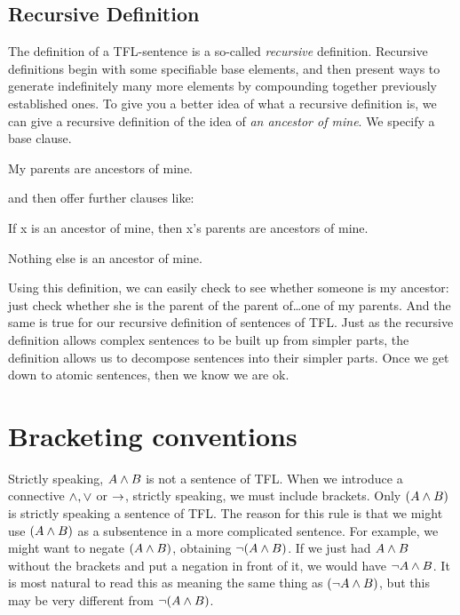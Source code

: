 \subsection{Recursive Definition}
The definition of a TFL-sentence is a so-called \emph{recursive} definition. Recursive definitions begin with some specifiable base elements, and then present ways to generate indefinitely many more elements by compounding together previously established ones. To give you a better idea of what a recursive definition is, we can give a recursive definition of the idea of \emph{an ancestor of mine}. We specify a base clause.
	\begin{ebullet}
		\item My parents are ancestors of mine.
	\end{ebullet}
and then offer further clauses like:
	\begin{ebullet}
		\item If x is an ancestor of mine, then x's parents are ancestors of mine.
		\item Nothing else is an ancestor of mine.
	\end{ebullet}
Using this definition, we can easily check to see whether someone is my ancestor: just check whether she is the parent of the parent of\ldots one of my parents. And the same is true for our recursive definition of sentences of TFL. Just as the recursive definition allows complex sentences to be built up from simpler parts, the definition allows us to decompose sentences into their simpler parts. Once we get down to atomic sentences, then we know we are ok.

\section{Bracketing conventions}
\label{TFLconventions}


Strictly speaking, $A\mathbin{\wedge} B$ is not a sentence of TFL. When we introduce a connective $\mathbin{\wedge},\vee$ or $\rightarrow$, strictly speaking, we must include brackets. Only $(A\mathbin{\wedge} B)$ is strictly speaking a sentence of TFL. The reason for this rule is that we might use $(A\mathbin{\wedge} B)$ as a subsentence in a more complicated sentence. For example, we might want to negate $(A\mathbin{\wedge} B)$, obtaining $\neg(A\mathbin{\wedge} B)$. If we just had $A \mathbin{\wedge} B$ without the brackets and put a negation in front of it, we would have $\neg A \mathbin{\wedge} B$. It is most natural to read this as meaning the same thing as $(\neg A \mathbin{\wedge} B)$, but this may be very different from $\neg(A\mathbin{\wedge} B)$.

